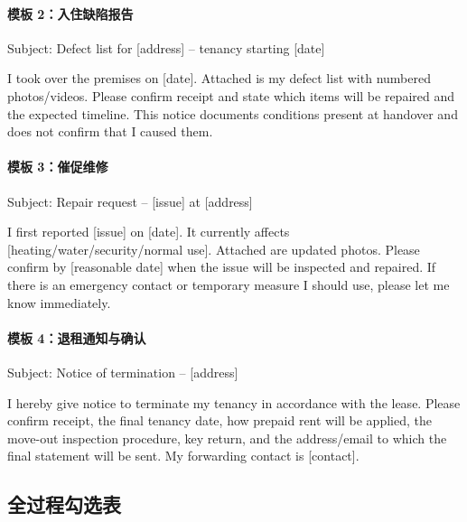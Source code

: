 \paragraph{模板 2：入住缺陷报告}

\begin{grayleftbox}
Subject: Defect list for [address] -- tenancy starting [date]

I took over the premises on [date]. Attached is my defect list with numbered photos/videos. Please confirm receipt and state which items will be repaired and the expected timeline. This notice documents conditions present at handover and does not confirm that I caused them.
\end{grayleftbox}

\paragraph{模板 3：催促维修}

\begin{grayleftbox}
Subject: Repair request -- [issue] at [address]

I first reported [issue] on [date]. It currently affects [heating/water/security/normal use]. Attached are updated photos. Please confirm by [reasonable date] when the issue will be inspected and repaired. If there is an emergency contact or temporary measure I should use, please let me know immediately.
\end{grayleftbox}

\paragraph{模板 4：退租通知与确认}

\begin{grayleftbox}
Subject: Notice of termination -- [address]

I hereby give notice to terminate my tenancy in accordance with the lease. Please confirm receipt, the final tenancy date, how prepaid rent will be applied, the move-out inspection procedure, key return, and the address/email to which the final statement will be sent. My forwarding contact is [contact].
\end{grayleftbox}

\subsection{全过程勾选表}

